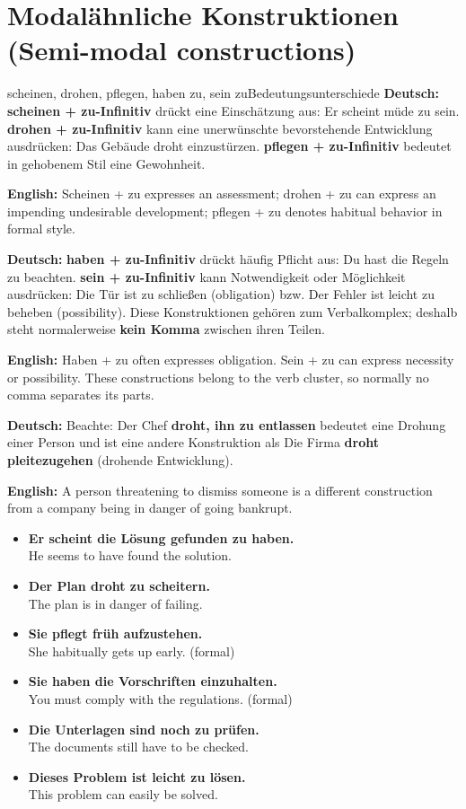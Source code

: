 \documentclass[a4paper,11pt]{article}
\newcommand{\GermanText}[1]{\textbf{Deutsch: }#1\par}
\newcommand{\EnglishText}[1]{{\small\color{SoftGray}\textbf{English: }#1\par}}
\newcommand{\ExampleItem}[2]{\item \textbf{#1}\\{\small\color{SoftGray}#2}}
\newcommand{\DEEN}[2]{\GermanText{#1}\EnglishText{#2}}
\newcommand{\Pair}[2]{\ExampleItem{#1}{#2}}
\begin{document}
\section{Modalähnliche Konstruktionen \textnormal{(Semi-modal constructions)}}
\begin{grammarentry}{scheinen, drohen, pflegen, haben zu, sein zu}{Bedeutungsunterschiede}
\DEEN{\textbf{scheinen + zu-Infinitiv} drückt eine Einschätzung aus: \glqq Er scheint müde zu sein.\grqq{} \textbf{drohen + zu-Infinitiv} kann eine unerwünschte bevorstehende Entwicklung ausdrücken: \glqq Das Gebäude droht einzustürzen.\grqq{} \textbf{pflegen + zu-Infinitiv} bedeutet in gehobenem Stil eine Gewohnheit.}{Scheinen + zu expresses an assessment; drohen + zu can express an impending undesirable development; pflegen + zu denotes habitual behavior in formal style.}
\DEEN{\textbf{haben + zu-Infinitiv} drückt häufig Pflicht aus: \glqq Du hast die Regeln zu beachten.\grqq{} \textbf{sein + zu-Infinitiv} kann Notwendigkeit oder Möglichkeit ausdrücken: \glqq Die Tür ist zu schließen\grqq{} (obligation) bzw. \glqq Der Fehler ist leicht zu beheben\grqq{} (possibility). Diese Konstruktionen gehören zum Verbalkomplex; deshalb steht normalerweise \textbf{kein Komma} zwischen ihren Teilen.}{Haben + zu often expresses obligation. Sein + zu can express necessity or possibility. These constructions belong to the verb cluster, so normally no comma separates its parts.}
\DEEN{Beachte: \glqq Der Chef \textbf{droht, ihn zu entlassen}\grqq{} bedeutet eine Drohung einer Person und ist eine andere Konstruktion als \glqq Die Firma \textbf{droht pleitezugehen}\grqq{} (drohende Entwicklung).}{A person threatening to dismiss someone is a different construction from a company being in danger of going bankrupt.}
\end{grammarentry}
\begin{exbox}\begin{itemize}
\Pair{Er scheint die Lösung gefunden zu haben.}{He seems to have found the solution.}
\Pair{Der Plan droht zu scheitern.}{The plan is in danger of failing.}
\Pair{Sie pflegt früh aufzustehen.}{She habitually gets up early. (formal)}
\Pair{Sie haben die Vorschriften einzuhalten.}{You must comply with the regulations. (formal)}
\Pair{Die Unterlagen sind noch zu prüfen.}{The documents still have to be checked.}
\Pair{Dieses Problem ist leicht zu lösen.}{This problem can easily be solved.}
\end{itemize}\end{exbox}
\end{document}
